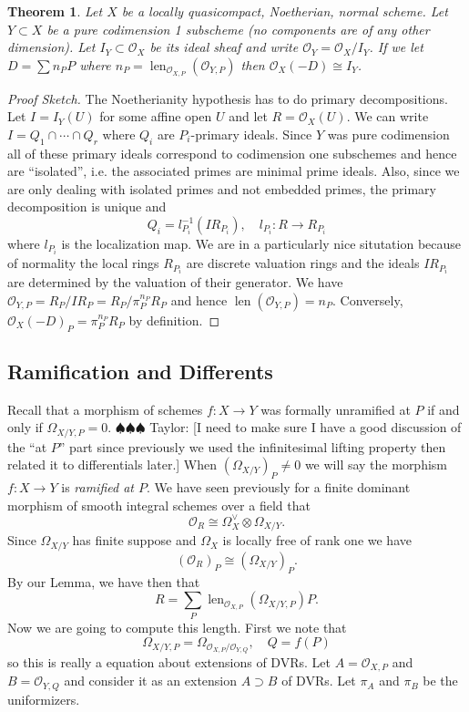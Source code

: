 \documentclass[12pt]{article}
\numberwithin{equation}{section}
\newtheorem{theorem}{Theorem}[subsection]
\theoremstyle{definition}
\theoremstyle{remark}
\newcommand{\Ocal}{\mathcal{O}}
\newcommand{\len}{\operatorname{len}}
\newcommand{\taylor}[1]{{\color{blue} \sf $\spadesuit\spadesuit\spadesuit$ Taylor: [#1]}}
\begin{document}
\begin{theorem}
Let $X$ be a locally quasicompact, Noetherian, normal scheme.
Let $Y \subset X$ be a pure codimension 1 subscheme (no components are of any other dimension).
Let $I_Y \subset \Ocal_X$ be its ideal sheaf and write $\Ocal_Y = \Ocal_X/I_Y$. 
If we let $D = \sum n_P P$ where $n_P = \len_{\Ocal_{X,P}}(\Ocal_{Y,P})$ then $\Ocal_X(-D) \cong I_Y$. 
\end{theorem}
\begin{proof}[Proof Sketch]
	The Noetherianity hypothesis has to do primary decompositions. 
	Let $I = I_Y(U)$ for some affine open $U$ and let $R=\Ocal_X(U)$.
	We can write $I = Q_1\cap \cdots \cap Q_r$ where $Q_i$ are $P_i$-primary ideals. 
	Since $Y$ was pure codimension all of these primary ideals correspond to codimension one subschemes and hence are ``isolated'', i.e. the associated primes are minimal prime ideals. 
	Also, since we are only dealing with isolated primes and not embedded primes, the primary decomposition is unique and 
	 $$ Q_i = l_{P_i}^{-1}( I R_{P_i} ), \quad l_{P_i}: R \to R_{P_i} $$
	where $l_{P_i}$ is the localization map.
	We are in a particularly nice situtation because of normality the local rings $R_{P_i}$ are discrete valuation rings and the ideals $IR_{P_i}$ are determined by the valuation of their generator.
	We have $\Ocal_{Y,P} = R_P/IR_P=R_P/\pi_P^{n_P}R_P$ and hence $\len(\Ocal_{Y,P})=n_P$. 
	Conversely, $\Ocal_X(-D)_P = \pi_P^{n_P}R_P$ by definition.
\end{proof}

\subsection{Ramification and Differents}
Recall that a morphism of schemes $f:X\to Y$ was formally unramified at $P$ if and only if $\Omega_{X/Y,P}=0$. \taylor{I need to make sure I have a good discussion of the ``at $P$'' part since previously we used the infinitesimal lifting property then related it to differentials later.} 
When $(\Omega_{X/Y})_P\neq 0$ we will say the morphism $f:X\to Y$ is \emph{ramified at $P$}. 
We have seen previously for a finite dominant morphism of smooth integral schemes over a field that 
 $$ \Ocal_R \cong \Omega_X^{\vee} \otimes \Omega_{X/Y}.$$
Since $\Omega_{X/Y}$ has finite suppose and $\Omega_X$ is locally free of rank one we have 
 $$ (\Ocal_R)_P \cong (\Omega_{X/Y})_P.$$
By our Lemma, we have then that 
 $$ R = \sum_P \len_{\Ocal_{X,P}}( \Omega_{X/Y,P}) P. $$
Now we are going to compute this length. 
First we note that 
 $$ \Omega_{X/Y,P} = \Omega_{\Ocal_{X,P}/\Ocal_{Y,Q}}, \quad Q=f(P) $$
so this is really a equation about extensions of DVRs. 
Let $A = \Ocal_{X,P}$ and $B=\Ocal_{Y,Q}$ and consider it as an extension $A\supset B$ of DVRs. 
Let $\pi_A$ and $\pi_B$ be the uniformizers.
\end{document}
